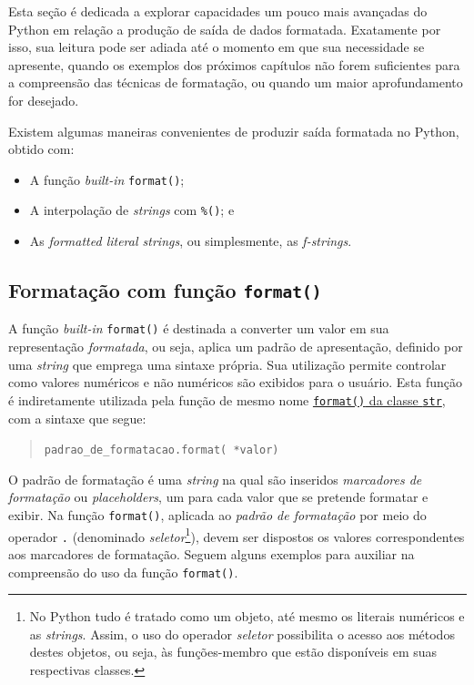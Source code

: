\documentclass[
]{book}
\providecommand{\tightlist}{%
  \setlength{\itemsep}{0pt}\setlength{\parskip}{0pt}}
\begin{document}
Esta seção é dedicada a explorar capacidades um pouco mais avançadas do Python em relação a produção de saída de dados formatada. Exatamente por isso, sua leitura pode ser adiada até o momento em que sua necessidade se apresente, quando os exemplos dos próximos capítulos não forem suficientes para a compreensão das técnicas de formatação, ou quando um maior aprofundamento for desejado.

Existem algumas maneiras convenientes de produzir saída formatada no Python, obtido com:

\begin{itemize}
\tightlist
\item
  A função \emph{built-in} \texttt{format()};
\item
  A interpolação de \emph{strings} com \texttt{\%()}; e
\item
  As \emph{formatted literal strings}, ou simplesmente, as \emph{f-strings}.
\end{itemize}

\hypertarget{e-s-format-funcao}{%
\subsection{\texorpdfstring{Formatação com função \texttt{format()}}{Formatação com função format()}}\label{e-s-format-funcao}}

A função \emph{built-in} \texttt{format()} é destinada a converter um valor em sua representação \emph{formatada}, ou seja, aplica um padrão de apresentação, definido por uma \emph{string} que emprega uma sintaxe própria. Sua utilização permite controlar como valores numéricos e não numéricos são exibidos para o usuário. Esta função é indiretamente utilizada pela função de mesmo nome \href{https://docs.python.org/3/tutorial/inputoutput.html\#the-string-format-method}{\texttt{format()} da classe \texttt{str}}, com a sintaxe que segue:

\begin{quote}
\texttt{\textquotesingle{}padrao\_de\_formatacao\textquotesingle{}.format(\ *valor)}
\end{quote}

O padrão de formatação é uma \emph{string} na qual são inseridos \emph{marcadores de formatação} ou \emph{placeholders}, um para cada valor que se pretende formatar e exibir. Na função \texttt{format()}, aplicada ao \emph{padrão de formatação} por meio do operador \texttt{.} (denominado \emph{seletor}\footnote{No Python tudo é tratado como um objeto, até mesmo os literais numéricos e as \emph{strings}. Assim, o uso do operador \emph{seletor} possibilita o acesso aos métodos destes objetos, ou seja, às funções-membro que estão disponíveis em suas respectivas classes.}), devem ser dispostos os valores correspondentes aos marcadores de formatação. Seguem alguns exemplos para auxiliar na compreensão do uso da função \texttt{format()}.
\end{document}
